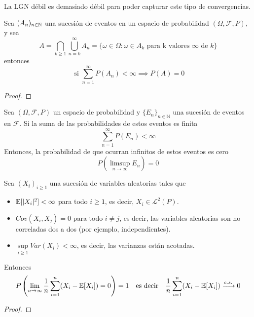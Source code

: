 \begin{observacion}
    La LGN débil es demasiado débil para poder capturar este tipo de convergencias.
\end{observacion}

\begin{lema}
    Sea $(A_n)_{n\in \mathbb{N}}$ una sucesión de eventos en un espacio de probabilidad $(\Omega, \mathcal{F}, P)$, y sea
    \begin{equation*}
        A=\bigcap_{k\geq 1} \bigcup_{n=k}^{\infty} A_n = \{\omega \in \Omega : \omega \in A_k \text{ para k valores } \infty \text{ de } k\}
    \end{equation*}
    entonces
    \begin{equation*}
        \text{ si } \sum_{n=1}^{\infty} P(A_n) < \infty \implies P(A) = 0
    \end{equation*}
    \begin{proof}
    \end{proof}
\end{lema}

\begin{coro}
    Sea $(\Omega, \mathcal{F}, P)$ un espacio de probabilidad y $\{E_n\}_{n \in \mathbb{N}}$ una sucesión de eventos en $\mathcal{F}$. Si la suma de las probabilidades de estos eventos es finita
    $$\sum_{n=1}^{\infty} P(E_n) < \infty$$
    Entonces, la probabilidad de que ocurran infinitos de estos eventos es cero
    $$P(\limsup_{n \to \infty} E_n) = 0$$
\end{coro}

\begin{teo}
    Sea $(X_i)_{i\geq 1}$ una sucesión de variables aleatorias tales que
    \begin{itemize}
        \item $\mathbb{E}[|X_i|^2] < \infty$ para todo $i\geq 1$, es decir, $X_i \in \mathcal{L}^2(P)$.
        \item $Cov(X_i, X_j) = 0$ para todo $i\neq j$, es decir, las variables aleatorias son no correladas dos a dos (por ejemplo, independientes).
        \item $\sup\limits_{i\geq 1} Var(X_i) < \infty$, es decir, las varianzas están acotadas.
    \end{itemize}
    Entonces
    \begin{equation*}
        P\left( \lim_{n\to \infty} \dfrac{1}{n} \sum_{i=1}^n (X_i - \mathbb{E}[X_i]) = 0 \right) = 1 \quad \text{es decir} \quad \dfrac{1}{n} \sum_{i=1}^n (X_i - \mathbb{E}[X_i]) \xrightarrow{c.s.} 0
    \end{equation*}
    \begin{proof}
    \end{proof}
\end{teo}

